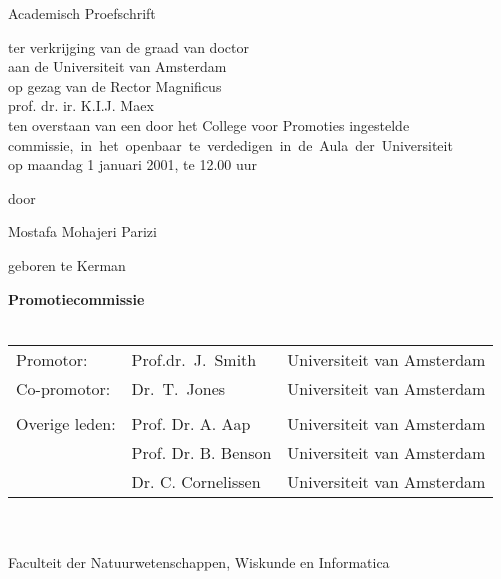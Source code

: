 {%
\clearpage
% 
 \par\vskip 2cm
 \begin{center}
 \printtitle
 \par\vspace {6cm}
 {\large \sc Academisch Proefschrift}
 \par\vspace {1cm}
 {\large ter verkrijging van de graad van doctor\\
 aan de Universiteit van Amsterdam\\
 op gezag van de Rector Magnificus\\
 prof. dr. ir. K.I.J. Maex\\                                 %
 ten overstaan van een door het College voor Promoties ingestelde\\
 \mbox{commissie, in het openbaar te verdedigen in de Aula der Universiteit}\\        %
 op maandag 1 januari 2001, te 12.00 uur \\ }        %
 \par\vspace {1cm} {\large door}
 \par \vspace {1cm} %
 {\Large Mostafa Mohajeri Parizi}                        %
 \par\vspace {1cm} %
 {\large geboren te Kerman} %
 \end{center}
 \clearpage
 \noindent%
 {\bfseries Promotiecommissie}\\
 \\
 \begin{tabular}[t]{@{}llr}
 Promotor:      & Prof.dr.\ J.~Smith  & Universiteit van Amsterdam \\  %
 Co-promotor:   & Dr.\ T.~Jones       & Universiteit van Amsterdam \\  %
 \\
 Overige leden: & Prof. Dr. A. Aap    & Universiteit van Amsterdam \\  %
                & Prof. Dr. B. Benson & Universiteit van Amsterdam \\  %
                & Dr. C. Cornelissen  & Universiteit van Amsterdam \\  %
 \end{tabular}\\
 \\
 Faculteit der Natuurwetenschappen, Wiskunde en Informatica\\ %

\clearpage
} %

